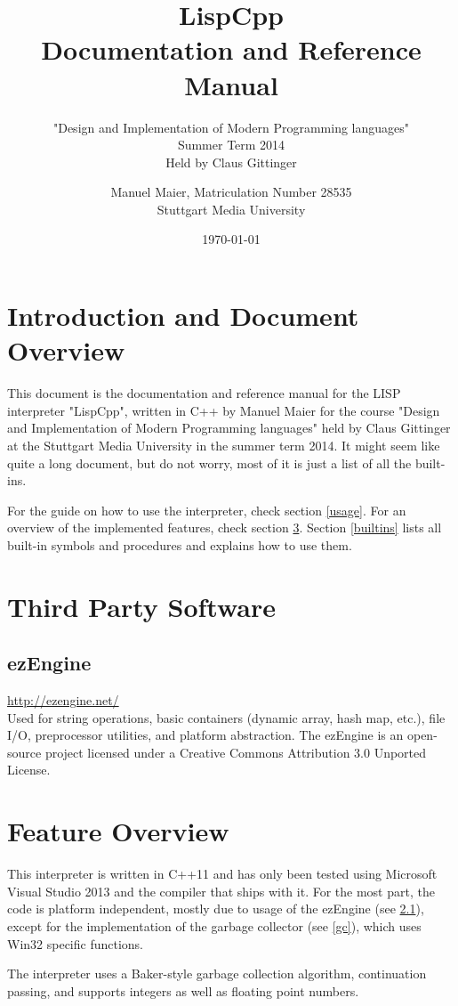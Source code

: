 \documentclass[a4paper]{scrartcl}
\title{LispCpp\\
	Documentation and Reference Manual}
\subtitle{"Design and Implementation of Modern Programming languages"\\
	Summer Term 2014\\
	Held by Claus Gittinger}
\author{Manuel Maier, Matriculation Number 28535\\
		Stuttgart Media University}
\date{\today}
\begin{document}
\maketitle
\tableofcontents
\clearpage

\section{Introduction and Document Overview}
\label{overview}
	This document is the documentation and reference manual for the LISP interpreter "LispCpp", written in C++ by Manuel Maier for the course "Design and Implementation of Modern Programming languages" held by Claus Gittinger at the Stuttgart Media University in the summer term 2014. It might seem like quite a long document, but do not worry, most of it is just a list of all the built-ins.

	For the guide on how to use the interpreter, check section \ref{usage}. For an overview of the implemented features, check section \ref{features}. Section \ref{builtins} lists all built-in symbols and procedures and explains how to use them.

\section{Third Party Software}
\label{thirdparty}
\subsection{ezEngine}
\label{ez}
	\url{http://ezengine.net/}\\
	Used for string operations, basic containers (dynamic array, hash map, etc.), file I\slash{}O, preprocessor utilities, and platform abstraction. The ezEngine is an open-source project licensed under a Creative Commons Attribution 3.0 Unported License.

\section{Feature Overview}
\label{features}
	This interpreter is written in C++11 and has only been tested using Microsoft Visual Studio 2013 and the compiler that ships with it. For the most part, the code is platform independent, mostly due to usage of the ezEngine (see \ref{ez}), except for the implementation of the garbage collector (see \ref{gc}), which uses Win32 specific functions.

	The interpreter uses a Baker-style garbage collection algorithm, continuation passing, and supports integers as well as floating point numbers.
\end{document}
